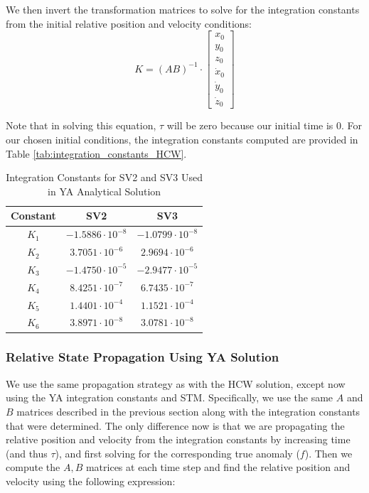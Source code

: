 We then invert the transformation matrices to solve for the integration constants from the initial relative position and velocity conditions:
\[
K = (A B)^{-1} \cdot \begin{bmatrix}
x_0 \\ y_0 \\ z_0 \\ \dot{x}_0 \\ \dot{y}_0 \\ \dot{z}_0
\end{bmatrix}
\]

Note that in solving this equation, $\tau$ will be zero because our initial time is 0. For our chosen initial conditions, the integration constants computed are provided in Table \ref{tab:integration_constants_HCW}.

\begin{table}[ht]
    \centering
    \renewcommand{\arraystretch}{1.2}
    \begin{tabular}{c c c}
        \toprule
        \textbf{Constant} & \textbf{SV2} & \textbf{SV3} \\
        \midrule
        $K_1$ & $-1.5886\cdot10^{-8}$ & $-1.0799\cdot10^{-8}$ \\
        $K_2$ & $3.7051\cdot10^{-6}$ & $2.9694\cdot10^{-6}$ \\
        $K_3$ & $-1.4750\cdot10^{-5}$& $-2.9477\cdot10^{-5}$\\
        $K_4$ & $8.4251\cdot10^{-7}$ & $6.7435\cdot10^{-7}$ \\
        $K_5$ & $1.4401\cdot10^{-4}$ & $1.1521\cdot10^{-4}$ \\
        $K_6$ & $3.8971\cdot10^{-8}$ & $3.0781\cdot10^{-8}$ \\
        \bottomrule
    \end{tabular}
    \caption{Integration Constants for SV2 and SV3 Used in YA Analytical Solution}
    \label{tab:integration_constants_YA}
\end{table}

\subsubsection{Relative State Propagation Using YA Solution}
We use the same propagation strategy as with the HCW solution, except now using the YA integration constants and STM. Specifically, we use the same $A$ and $B$ matrices described in the previous section along with the integration constants that were determined. The only difference now is that we are propagating the relative position and velocity from the integration constants by increasing time (and thus $\tau$), and first solving for the corresponding true anomaly ($f$). Then we compute the $A, B$ matrices at each time step and find the relative position and velocity using the following expression:

